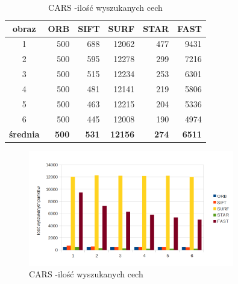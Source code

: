 \begin{table}[htbp]
  \centering
  \caption{CARS -ilość wyszukanych cech}
    \begin{tabular}{|c|r|r|r|r|r|}\hline
    
    obraz & \textbf{ORB} & \textbf{SIFT} & \textbf{SURF} & \textbf{STAR} & \textbf{FAST} \\\hline
    
   
    1 & 500 & 688 & 12062 & 477 & 9431 \\
    2 & 500 & 595 & 12278 & 299 & 7216 \\
    3 & 500 & 515 & 12234 & 253 & 6301 \\
    4 & 500 & 481 & 12141 & 219 & 5806 \\
    5 & 500 & 463 & 12215 & 204 & 5336 \\
    6 & 500 & 445 & 12008 & 190 & 4974 \\\hline
    \textbf{średnia} & \textbf{500} & \textbf{531} & \textbf{12156} & \textbf{274} & \textbf{6511} \\
    \hline
    \end{tabular}%
  \label{tab:cars_f1}%
\end{table}%


\begin{figure}
\centering
\includegraphics[width=0.8\textwidth]{pict/mikolajczyk/light/f1.png}
\caption{CARS -ilość wyszukanych cech}
\label{fig:cars_f1}
\end{figure}


